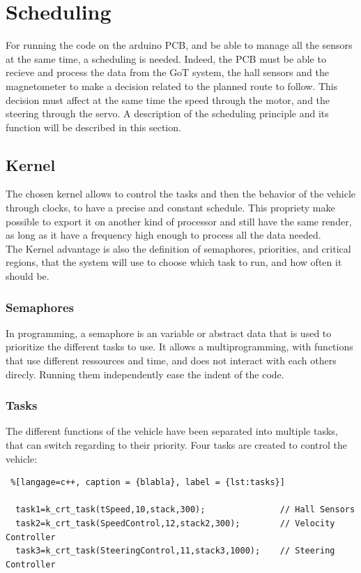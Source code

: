 \section{Scheduling}
For running the code on the arduino PCB, and be able to manage all the sensors at the same time, a scheduling is needed. Indeed, the PCB must be able to recieve and process the data from the GoT system, the hall sensors and the magnetometer to make a decision related to the planned route to follow. This decision must affect at the same time the speed through the motor, and the steering through the servo.
A description of the scheduling principle and its function will be described in this section.


\subsection{Kernel}
The chosen kernel allows to control the tasks and then the behavior of the vehicle through clocks, to have a precise and constant schedule. This propriety make possible to export it on another kind of processor and still have the same render, as long as it have a frequency high enough to process all the data needed.\\
The Kernel advantage is also the definition of semaphores, priorities, and critical regions, that the system will use to choose which task to run, and how often it should be.


\subsubsection{Semaphores}
In programming, a semaphore is an variable or abstract data that is used to prioritize the different tasks to use. It allows a multiprogramming, with functions that use different ressources and time, and does not interact with each others direcly. Running them independently ease the indent of the code.



\subsubsection{Tasks}
The different functions of the vehicle have been separated into multiple tasks, that can switch regarding to their priority. Four tasks are created to control the vehicle:

\begin{lstlisting} %[langage=c++, caption = {blabla}, label = {lst:tasks}]

  task1=k_crt_task(tSpeed,10,stack,300);               // Hall Sensors
  task2=k_crt_task(SpeedControl,12,stack2,300);        // Velocity Controller
  task3=k_crt_task(SteeringControl,11,stack3,1000);    // Steering Controller

\end{lstlisting}

